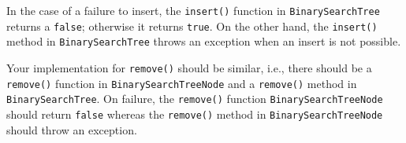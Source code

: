 In the case of a failure to insert, the \verb!insert()! function
in \verb!BinarySearchTree!
returns a \verb!false!; otherwise it returns \verb!true!.
On the other hand, the \verb!insert()! method in \verb!BinarySearchTree!
throws an exception when an insert is not possible.

Your implementation for \verb!remove()! should be similar, i.e.,
there should be a \verb!remove()! function in \verb!BinarySearchTreeNode!
and a \verb!remove()! method in \verb!BinarySearchTree!.
On failure, 
the \verb!remove()! function \verb!BinarySearchTreeNode! 
should return \verb!false! whereas the \verb!remove()! method in 
\verb!BinarySearchTreeNode! should throw an exception.

